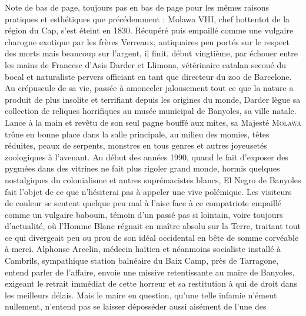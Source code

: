 Note de bas de page, toujours pas en bas de page pour les mêmes raisons pratiques et esthétiques que précédemment : Molawa VIII, chef hottentot de la région du Cap, s’est éteint en 1830. Récupéré puis empaillé comme une vulgaire charogne exotique par les frères Verreaux, antiquaires peu portés sur le respect des morts mais beaucoup sur l’argent, il finit, début vingtième, par échouer entre les mains de Francesc d’Asis Darder et Llimona, vétérinaire catalan secoué du bocal et naturaliste pervers officiant en tant que directeur du zoo de Barcelone. Au crépuscule de sa vie, passée à amonceler jalousement tout ce que la nature a produit de plus insolite et terrifiant depuis les origines du monde, Darder lègue sa collection de reliques horrifiques au musée municipal de Banyoles, sa ville natale. Lance à la main et revêtu de son seul pagne bouffé aux mites, sa Majesté \textsc{Molawa} trône en bonne place dans la salle principale, au milieu des momies, têtes réduites, peaux de serpents, monstres en tous genres et autres joyeusetés zoologiques à l’avenant. Au début des années 1990, quand le fait d’exposer des pygmées dans des vitrines ne fait plus rigoler grand monde, hormis quelques nostalgiques du colonialisme et autres suprémacistes blancs, El Negro de Banyoles fait l’objet de ce que n’hésiterai pas à appeler une vive polémique. Les visiteurs de couleur se sentent quelque peu mal à l’aise face à ce compatriote empaillé comme un vulgaire babouin, témoin d’un passé pas si lointain, voire toujours d’actualité, où l’Homme Blanc régnait en maître absolu sur la Terre, traitant tout ce qui divergeait peu ou prou de son idéal occidental en bête de somme corvéable à merci. Alphonse Arcelin, médecin haïtien et néanmoins \illusloflabel{}socialiste installé à Cambrils, sympathique station balnéaire du Baix Camp, près de Tarragone, entend parler de l’affaire, envoie une missive retentissante au maire de Banyoles, exigeant le retrait immédiat de cette horreur et sa restitution à qui de droit dans les meilleurs délais. Mais le maire en question, qu’une telle infamie n’émeut nullement, n’entend pas se laisser déposséder aussi aisément de l’une des 